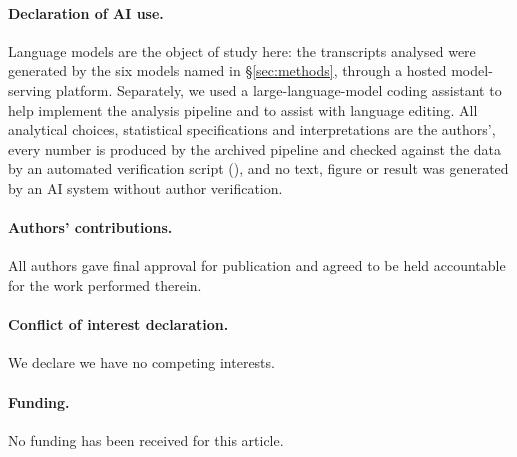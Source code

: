 \documentclass[11pt,a4paper]{article}
\begin{document}
\paragraph{Declaration of AI use.} Language models are the object of study here:
the transcripts analysed were generated by the six models named in
\S\ref{sec:methods}, through a hosted model-serving platform. Separately, we
used a large-language-model coding assistant to help implement the analysis
pipeline and to assist with language editing. All analytical choices,
statistical specifications and interpretations are the authors', every number is
produced by the archived pipeline and checked against the data by an automated
verification script (), and no text,
figure or result was generated by an AI system without author verification.

\paragraph{Authors' contributions.} %
All authors gave final approval for publication and agreed to be held
accountable for the work performed therein.

\paragraph{Conflict of interest declaration.} We declare we have no competing
interests.

\paragraph{Funding.} No funding has been received for this article.




\end{document}
